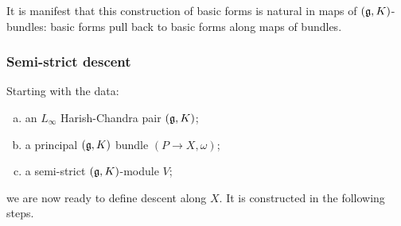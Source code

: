 It is manifest that this construction of basic forms is natural in maps of $(\mathfrak g,K)$-bundles: basic forms pull back to basic forms along maps of bundles.

\subsubsection{Semi-strict descent} \label{sec: extended descent}

Starting with the data:
\begin{enumerate}[(a)]
\item an $L_\infty$ Harish-Chandra pair $(\mathfrak g,K)$;
\item a principal $(\mathfrak g,K)$ bundle $(P \to X, \omega)$;
\item a semi-strict $(\mathfrak g,K)$-module $V$;
\end{enumerate}
we are now ready to define descent along $X$. 
It is constructed in the following steps.

